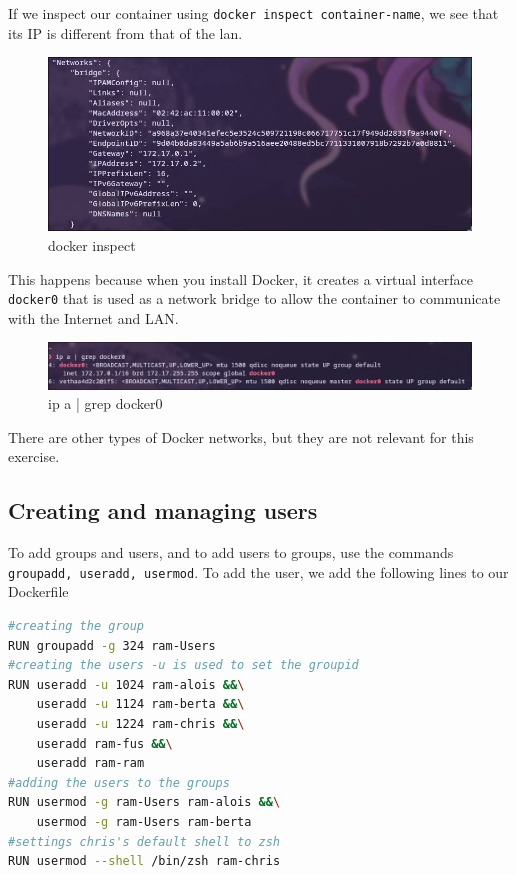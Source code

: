 \documentclass[a4paper]{article}
\begin{document}
If we inspect our container using \texttt{docker inspect container-name}, we see that its IP is different from that of the lan.

\begin{figure}[h]
	\centering
	\includegraphics[scale=0.3]{images/docker_inspect_nw.png}
	\caption{docker inspect}
\end{figure}
This happens because when you install Docker, it creates a virtual interface \texttt{docker0} that is used as a network bridge to allow the container to communicate with the Internet and LAN. \cite{docker-networking-video}
\begin{figure}[h]
	\centering
	\includegraphics[scale=0.3]{images/ipadocker.png}
	\caption{ip a | grep docker0}
\end{figure}
There are other types of Docker networks, but they are not relevant for this exercise.\cite{docker-networking-video}

\newpage
\subsection{Creating and managing users}

To add groups and users, and to add users to groups, use the commands \texttt{groupadd, useradd, usermod}.
To add the user, we add the following lines to our Dockerfile
\begin{lstlisting}[language=bash]
#creating the group
RUN groupadd -g 324 ram-Users 
#creating the users -u is used to set the groupid
RUN useradd -u 1024 ram-alois &&\
    useradd -u 1124 ram-berta &&\
    useradd -u 1224 ram-chris &&\
    useradd ram-fus &&\
    useradd ram-ram
#adding the users to the groups
RUN usermod -g ram-Users ram-alois &&\
    usermod -g ram-Users ram-berta
#settings chris's default shell to zsh
RUN usermod --shell /bin/zsh ram-chris 
\end{lstlisting}
\end{document}
